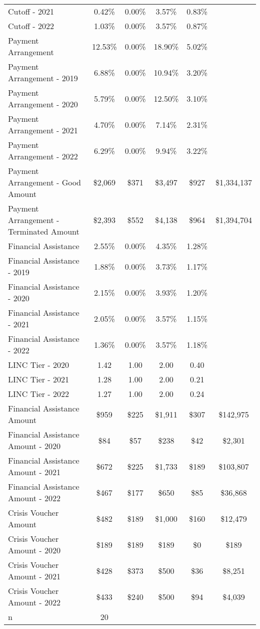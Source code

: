 \begin{tabular}{l|c|c|c|c|c}
\quad Cutoff - 2021 & 0.42\% & 0.00\% & 3.57\% & 0.83\% \\
\quad Cutoff - 2022 & 1.03\% & 0.00\% & 3.57\% & 0.87\% \\
\midrule 
Payment Arrangement & 12.53\% & 0.00\% & 18.90\% & 5.02\% \\
\quad Payment Arrangement - 2019 & 6.88\% & 0.00\% & 10.94\% & 3.20\% \\
\quad Payment Arrangement - 2020 & 5.79\% & 0.00\% & 12.50\% & 3.10\% \\
\quad Payment Arrangement - 2021 & 4.70\% & 0.00\% & 7.14\% & 2.31\% \\
\quad Payment Arrangement - 2022 & 6.29\% & 0.00\% & 9.94\% & 3.22\% \\
\quad Payment Arrangement - Good Amount & \$2,069 & \$371 & \$3,497 & \$927 & \$1,334,137 \\
\quad Payment Arrangement - Terminated Amount & \$2,393 & \$552 & \$4,138 & \$964 & \$1,394,704 \\
\midrule 
Financial Assistance & 2.55\% & 0.00\% & 4.35\% & 1.28\% \\
\quad Financial Assistance - 2019 & 1.88\% & 0.00\% & 3.73\% & 1.17\% \\
\quad Financial Assistance - 2020 & 2.15\% & 0.00\% & 3.93\% & 1.20\% \\
\quad Financial Assistance - 2021 & 2.05\% & 0.00\% & 3.57\% & 1.15\% \\
\quad Financial Assistance - 2022 & 1.36\% & 0.00\% & 3.57\% & 1.18\% \\
\midrule 
LINC Tier - 2020 & 1.42 & 1.00 & 2.00 & 0.40 \\
LINC Tier - 2021 & 1.28 & 1.00 & 2.00 & 0.21 \\
LINC Tier - 2022 & 1.27 & 1.00 & 2.00 & 0.24 \\
\midrule 
Financial Assistance Amount & \$959 & \$225 & \$1,911 & \$307 & \$142,975 \\
\quad Financial Assistance Amount - 2020 & \$84 & \$57 & \$238 & \$42 & \$2,301 \\
\quad Financial Assistance Amount - 2021 & \$672 & \$225 & \$1,733 & \$189 & \$103,807 \\
\quad Financial Assistance Amount - 2022 & \$467 & \$177 & \$650 & \$85 & \$36,868 \\
\midrule 
Crisis Voucher Amount & \$482 & \$189 & \$1,000 & \$160 & \$12,479 \\
\quad Crisis Voucher Amount - 2020 & \$189 & \$189 & \$189 & \$0 & \$189 \\
\quad Crisis Voucher Amount - 2021 & \$428 & \$373 & \$500 & \$36 & \$8,251 \\
\quad Crisis Voucher Amount - 2022 & \$433 & \$240 & \$500 & \$94 & \$4,039 \\
\midrule 
n & 20 &  &  &  &  \\
\midrule 
\bottomrule 
\end{tabular}
